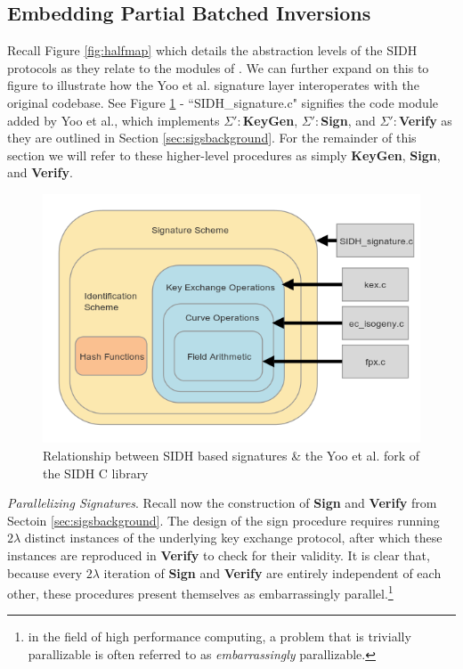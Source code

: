 \subsection{Embedding Partial Batched Inversions}

Recall Figure \ref{fig:halfmap} which details the abstraction levels of the SIDH protocols as they relate to the modules of \sidh. We can further expand on this to figure to illustrate how the Yoo et al. signature layer interoperates with the original \sidh codebase. See Figure \ref{fig:fullmap} - ``SIDH\_signature.c" signifies the code module added by Yoo et al., which implements $\Sigma':$\textbf{KeyGen}, $\Sigma':$\textbf{Sign}, and $\Sigma':$\textbf{Verify} as they are outlined in Section \ref{sec:sigsbackground}. For the remainder of this section we will refer to these higher-level procedures as simply \textbf{KeyGen}, \textbf{Sign}, and \textbf{Verify}.

\begin{figure}[htp]
\centering
\includegraphics[scale=0.7]{fullmapwcurve.png} %
\caption{Relationship between SIDH based signatures \& the Yoo et al. fork of the SIDH C library}
\label{fig:fullmap} %
\end{figure}

\noindent
\emph{Parallelizing Signatures}. Recall now the construction of \textbf{Sign} and \textbf{Verify} from Sectoin \ref{sec:sigsbackground}. The design of the sign procedure requires running $2\lambda$ distinct instances of the underlying key exchange protocol, after which these instances are reproduced in \textbf{Verify} to check for their validity. It is clear that, because every $2\lambda$ iteration of \textbf{Sign} and \textbf{Verify} are entirely independent of each other, these procedures present themselves as embarrassingly parallel.\footnote{in the field of high performance computing, a problem that is trivially parallizable is often referred to as \emph{embarrassingly} parallizable.} 


